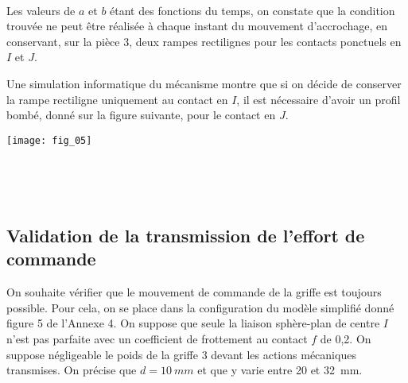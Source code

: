 \ifprof
\begin{corrige}~\\
\end{corrige}
\else
\fi

Les valeurs de $a$ et $b$ étant des fonctions du temps, on constate que la condition trouvée ne peut être réalisée
à chaque instant du mouvement d'accrochage, en conservant, sur la pièce 3, deux rampes rectilignes pour les
contacts ponctuels en $I$ et $J$.

Une simulation informatique du mécanisme montre que si on décide de conserver la rampe rectiligne
uniquement au contact en $I$, il est nécessaire d'avoir un profil bombé, donné sur la figure suivante, pour
le contact en $J$.

\begin{marginfigure}
\texttt{[image: fig\_05]}
\end{marginfigure}

\ifprof
\begin{corrige}~\\
\end{corrige}
\else
\fi



\ifprof
\begin{corrige}~\\
\end{corrige}
\else
\fi


\subsection*{Validation de la transmission de l'effort de commande}


On souhaite vérifier que le mouvement de commande de la griffe est toujours possible. Pour cela, on se
place dans la configuration du modèle simplifié donné figure 5 de l'Annexe 4. On suppose que seule la liaison
sphère-plan de centre $I$ n'est pas parfaite avec un coefficient de frottement au contact $f$ de 0,2. On suppose
négligeable le poids de la griffe 3 devant les actions mécaniques transmises. On précise que $d=\SI{10}{mm}$ et que
y varie entre 20 et \SI{32}{mm}.

\ifprof
\begin{corrige}~\\
\end{corrige}
\else
\fi

